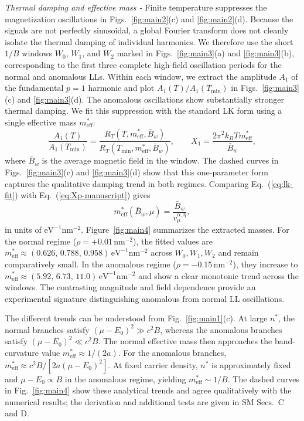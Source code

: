 \documentclass[prl,twocolumn,superscriptaddress,float,aps]{revtex4-2}
\newcommand{\meff}{m^{*}_{\mathrm{eff}}}
\newcommand{\kB}{k_{\!B}}
\begin{document}
{\it Thermal damping and effective mass - } Finite temperature suppresses the
magnetization oscillations in Figs.~\ref{fig:main2}(c) and
\ref{fig:main2}(d). Because the signals are not perfectly sinusoidal, a global
Fourier transform does not cleanly isolate the thermal damping of individual
harmonics. We therefore use the short $1/B$ windows $W_0$, $W_1$, and $W_2$
marked in Figs.~\ref{fig:main3}(a) and \ref{fig:main3}(b), corresponding to
the first three complete high-field oscillation periods for the normal and
anomalous LLs. Within each window, we extract the amplitude $A_1$ of the
fundamental $p=1$ harmonic and plot $A_1(T)/A_1(T_{\min})$ in
Figs.~\ref{fig:main3}(c) and \ref{fig:main3}(d). The anomalous oscillations
show substantially stronger thermal damping. We fit this suppression with the
standard LK form using a single effective mass $\meff$:
\begin{equation}
	\frac{A_1(T)}{A_1(T_{\min})}
	= \frac{R_T(T,\meff,\bar{B}_w)}{R_T(T_{\min},\meff,\bar{B}_w)},\qquad
	X_1 = \frac{2\pi^{2} \kB T \meff}{\bar{B}_w},
	\label{eq:lk-fit}
\end{equation}
where $\bar{B}_w$ is the average magnetic field in the window. The dashed
curves in Figs.~\ref{fig:main3}(c) and \ref{fig:main3}(d) show that this
one-parameter form captures the qualitative damping trend in both regimes.
Comparing Eq.~(\ref{eq:lk-fit}) with Eq.~(\ref{eq:Xp-manuscript}) gives
\begin{equation}
	\meff(\bar{B}_w,\mu) = \frac{\bar{B}_w}{v_\mu^{\alpha,\eta}}, 
	\label{eq:meff-def}
\end{equation}
in units of $\mathrm{eV}^{-1}\mathrm{nm}^{-2}$. Figure~\ref{fig:main4}
summarizes the extracted masses. For the normal regime
($\rho=+0.01\,\mathrm{nm}^{-2}$), the fitted values are
$\meff\approx(0.626,\,0.788,\,0.958)\,\mathrm{eV}^{-1}\mathrm{nm}^{-2}$
across $W_0,W_1,W_2$ and remain comparatively small. In the anomalous regime
($\rho=-0.15\,\mathrm{nm}^{-2}$), they increase to
$\meff\approx(5.92,\,6.73,\,11.0)\,\mathrm{eV}^{-1}\mathrm{nm}^{-2}$ and
show a clear monotonic trend across the windows. The contrasting magnitude and
field dependence provide an experimental signature distinguishing anomalous
from normal LL oscillations.

The different trends can be understood from Fig.~\ref{fig:main1}(c). At large
$n^*$, the normal branches satisfy $(\mu-E_0)^2\gg c^2B$, whereas the
anomalous branches satisfy $(\mu-E_0)^2\ll c^2B$. The normal effective mass
then approaches the band-curvature value $\meff\approx1/(2a)$. For the
anomalous branches,
$\meff\approx c^2B/[2a(\mu-E_0)^2]$. At fixed carrier density, $n^*$ is
approximately fixed and $\mu-E_0\propto B$ in the anomalous regime, yielding
$\meff\sim1/B$. The dashed curves in Fig.~\ref{fig:main4} show these
analytical trends and agree qualitatively with the numerical results; the
derivation and additional tests are given in SM Secs.~C and D.
\end{document}
